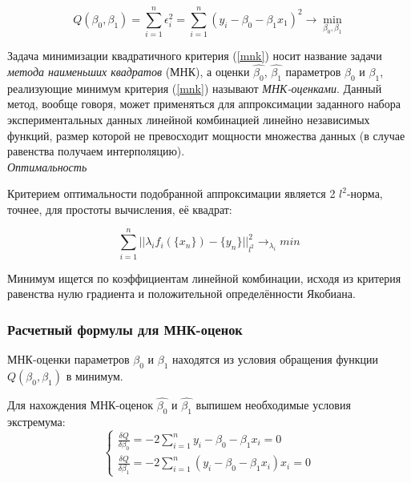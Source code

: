\documentclass[a4paper]{article}
\begin{document}
        \begin{equation} \label{mnk}
            Q(\beta_0, \beta_1) = \sum\limits_{i=1}^n{\epsilon^{2}_{i}} = \sum\limits_{i=1}^n{(y_i - \beta_0 - \beta_1 x_1)^{2}} \rightarrow \min_{\beta_0, \beta_1}
        \end{equation}
        
        Задача минимизации квадратичного критерия (\ref{mnk}) носит название задачи \textit{метода наименьших квадратов} (МНК), а оценки $\widehat{\beta_0}$, $\widehat{\beta_1}$ параметров $\beta_0$ и $\beta_1$, реализующие минимум критерия (\ref{mnk}) называют \textit{МНК-оценками}. Данный метод, вообще говоря, может применяться для аппроксимации заданного набора экспериментальных данных линейной комбинацией линейно независимых функций, размер которой не превосходит мощности множества данных (в случае равенства получаем интерполяцию).\\
        
        \textit{Оптимальность}
        
        Критерием оптимальности подобранной аппроксимации является 2 $l^{2}$-норма, точнее, для простоты вычисления, её квадрат:
        
        \begin{equation} \label{square norm mnk}
            \sum\limits_{i=1}^{n}{{||\lambda_i f_i(\{x_n\}) - \{y_n\}||}_{l^2}^{2}} \rightarrow_{\lambda_i} min
        \end{equation}
        
        Минимум ищется по коэффициентам линейной комбинации, исходя из критерия равенства нулю градиента и положительной определённости Якобиана.

        
        \subsubsection{Расчетный формулы для МНК-оценок}
        
        МНК-оценки параметров $\beta_0$ и $\beta_1$ находятся из условия обращения функции $Q(\beta_0, \beta_1)$ в минимум.
        
        Для нахождения МНК-оценок $\widehat{\beta_0}$ и $\widehat{\beta_1}$ выпишем необходимые условия экстремума: \\
        
        \begin{equation} \label{extremum cond}
            \begin{cases}
                \frac{\delta Q}{\delta \beta_0} = -2 \sum\limits_{i=1}^{n}{y_i - \beta_0 - \beta_1 x_i} = 0 \\
                \frac{\delta Q}{\delta \beta_1} = -2 \sum\limits_{i=1}^{n}{(y_i - \beta_0 - \beta_1 x_i)} x_i = 0
            \end{cases}
        \end{equation}
        
\end{document}
